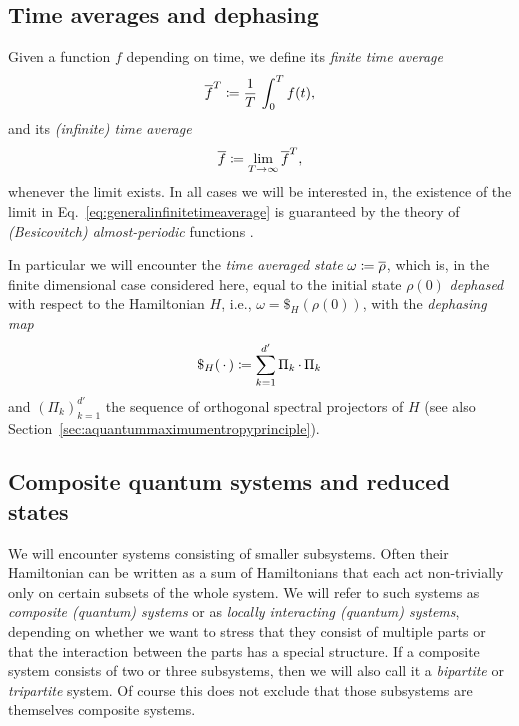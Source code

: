 \documentclass[a4paper,12pt,listof=totoc,index=totoc,bibliography=totoc,headsepline=false,headings=normal,BCOR16.153846mm,DIV12,headinclude,twoside,cleardoublepage=empty,numbers=noenddot,final]{scrreprt}
\theoremstyle{mystyle}
\numberwithin{equation}{section}
\numberwithin{figure}{section}
\numberwithin{lemma}{section}
\numberwithin{theorem}{section}
\numberwithin{corollary}{section}
\numberwithin{definition}{section}
\numberwithin{conjecture}{section}
\numberwithin{observation}{section}
\newcommand{\+}{\mkern2mu}
\newcommand{\coloneqq}{\mathrel{\vcentcolon\mkern-1.2mu=}} %
\newcommand{\texteqref}[1]{Eq.~\eqref{#1}}
\newcommand{\argdot}{{\,\cdot\,}}
\renewcommand{\H}{H}
\newcommand{\taverage}[2][]{
  \ifthenelse{\equal{#1}{}}
  {\overline{#2}}
  {\overline{#2}^{#1}}
}
\DeclareMathOperator{\1}{\mathds{1}}
\begin{document}



\subsection{Time averages and dephasing}
\label{sec:timeaverages}
%
Given a function $f$ depending on time, we define its \emph{finite time average}
\begin{equation} \label{eq:generalfinitetimeaverage}
  \taverage[T]{f} \coloneqq \frac{1}{T}\,\int_0^T f(t) ,
\end{equation}
and its \emph{(infinite) time average}
\begin{equation} \label{eq:generalinfinitetimeaverage}
  \taverage{f} \coloneqq \lim_{T\to\infty} \taverage[T]{f} ,
\end{equation}
whenever the limit exists.
In all cases we will be interested in, the existence of the limit in \texteqref{eq:generalinfinitetimeaverage} is guaranteed by the theory of \emph{(Besicovitch) almost-periodic} functions \cite{Besicovitch1926}.

In particular we will encounter the \emph{time averaged state} $\omega \coloneqq \taverage{\rho}$, which is, in the finite dimensional case considered here, equal to the initial state $\rho(0)$ \emph{dephased} with respect to the Hamiltonian $\H$, i.e., $\omega = \$_\H(\rho(0))$, with the \emph{dephasing map}
\begin{equation}
  \$_\H(\argdot) \coloneqq \sum_{k=1}^{d'} \Pi_k \argdot \Pi_k
\end{equation}
and $(\Pi_k)_{k=1}^{d'}$ the sequence of orthogonal spectral projectors of $\H$ (see also Section~\ref{sec:aquantummaximumentropyprinciple}).


\subsection{Composite quantum systems and reduced states}
\label{sec:localquantumsystems}
%
We will encounter systems consisting of smaller subsystems.
Often their Hamiltonian can be written as a sum of Hamiltonians that each act non-trivially only on certain subsets of the whole system.
We will refer to such systems as \emph{composite (quantum) systems} or as \emph{locally interacting (quantum) systems}, depending on whether we want to stress that they consist of multiple parts or that the interaction between the parts has a special structure.
If a composite system consists of two or three subsystems, then we will also call it a \emph{bipartite} or \emph{tripartite} system.
Of course this does not exclude that those subsystems are themselves composite systems.
\end{document}
